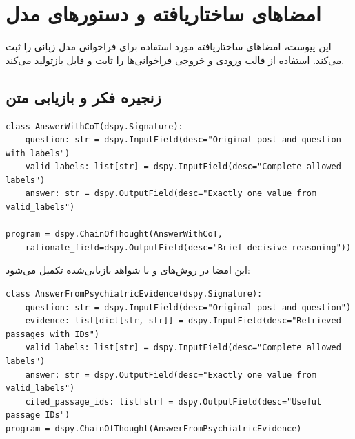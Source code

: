 \chapter{امضاهای ساختاریافته و دستورهای مدل}\label{app:prompts}

این پیوست، امضاهای ساختاریافته مورد استفاده برای فراخوانی مدل زبانی را ثبت می‌کند. استفاده از  قالب ورودی و خروجی فراخوانی‌ها را ثابت و قابل بازتولید می‌کند.

\section{زنجیره فکر و بازیابی متن}
\begin{latin}\footnotesize\begin{verbatim}
class AnswerWithCoT(dspy.Signature):
    question: str = dspy.InputField(desc="Original post and question with labels")
    valid_labels: list[str] = dspy.InputField(desc="Complete allowed labels")
    answer: str = dspy.OutputField(desc="Exactly one value from valid_labels")

program = dspy.ChainOfThought(AnswerWithCoT,
    rationale_field=dspy.OutputField(desc="Brief decisive reasoning"))
\end{verbatim}
\end{latin}

این امضا در روش‌های  و  با شواهد بازیابی‌شده تکمیل می‌شود:
\begin{latin}\footnotesize\begin{verbatim}
class AnswerFromPsychiatricEvidence(dspy.Signature):
    question: str = dspy.InputField(desc="Original post and question")
    evidence: list[dict[str, str]] = dspy.InputField(desc="Retrieved passages with IDs")
    valid_labels: list[str] = dspy.InputField(desc="Complete allowed labels")
    answer: str = dspy.OutputField(desc="Exactly one value from valid_labels")
    cited_passage_ids: list[str] = dspy.OutputField(desc="Useful passage IDs")
program = dspy.ChainOfThought(AnswerFromPsychiatricEvidence)
\end{verbatim}
\end{latin}

